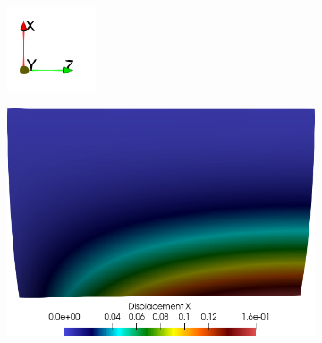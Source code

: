 \begin{figure}[h!]
    \centering
    \caption{Campos de deslocamentos obtido na simulação de \textit{Scordelis-Lo roof}.}
    \begin{subfigure}{0.1\textwidth}
    \includegraphics[width=\linewidth]{Figuras/scordelis/eixos.png}
    \end{subfigure}
    \begin{subfigure}{0.4\textwidth}
    \includegraphics[width=\linewidth]{Figuras/scordelis/ux.png}
    \end{subfigure}

\end{figure}
